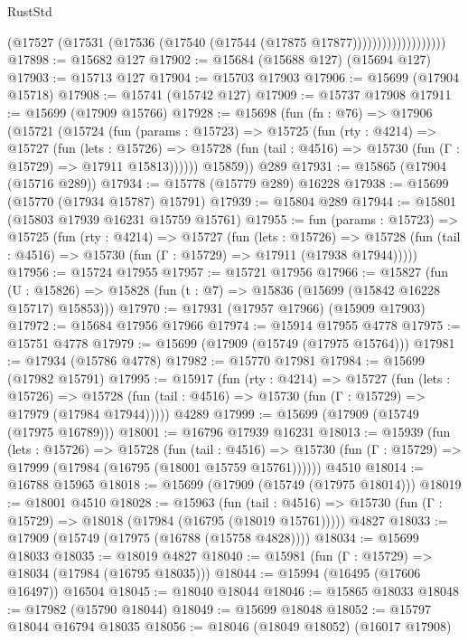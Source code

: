 \begin{lexlean}{RustStd}
\begin{coremodule}
                              (@17527
                                (@17531 (@17536 (@17540 (@17544 (@17875 @17877)))))))))))))))))))
@17898 := @15682 @127
@17902 := @15684 (@15688 @127) (@15694 @127)
@17903 := @15713 @127
@17904 := @15703 @17903
@17906 := @15699 (@17904 @15718)
@17908 := @15741 (@15742 @127)
@17909 := @15737 @17908
@17911 := @15699 (@17909 @15766)
@17928 := @15698
    (fun (fn : @76) =>
    @17906
      (@15721
        (@15724
          (fun (params : @15723) =>
          @15725
            (fun (rty : @4214) =>
            @15727
              (fun (lets : @15726) =>
              @15728 (fun (tail : @4516) => @15730 (fun (Γ : @15729) => @17911 @15813))))))
        @15859))
    @289
@17931 := @15865 (@17904 (@15716 @289))
@17934 := @15778 (@15779 @289) @16228
@17938 := @15699 (@15770 (@17934 @15787) @15791)
@17939 := @15804 @289
@17944 := @15801 (@15803 @17939 @16231 @15759 @15761)
@17955 := fun (params : @15723) =>
  @15725
    (fun (rty : @4214) =>
    @15727
      (fun (lets : @15726) =>
      @15728 (fun (tail : @4516) => @15730 (fun (Γ : @15729) => @17911 (@17938 @17944)))))
@17956 := @15724 @17955
@17957 := @15721 @17956
@17966 := @15827
    (fun (U : @15826) => @15828 (fun (t : @7) => @15836 (@15699 (@15842 @16228 @15717) @15853)))
@17970 := @17931 (@17957 @17966) (@15909 @17903)
@17972 := @15684 @17956 @17966
@17974 := @15914 @17955 @4778
@17975 := @15751 @4778
@17979 := @15699 (@17909 (@15749 (@17975 @15764)))
@17981 := @17934 (@15786 @4778)
@17982 := @15770 @17981
@17984 := @15699 (@17982 @15791)
@17995 := @15917
    (fun (rty : @4214) =>
    @15727
      (fun (lets : @15726) =>
      @15728 (fun (tail : @4516) => @15730 (fun (Γ : @15729) => @17979 (@17984 @17944)))))
    @4289
@17999 := @15699 (@17909 (@15749 (@17975 @16789)))
@18001 := @16796 @17939 @16231
@18013 := @15939
    (fun (lets : @15726) =>
    @15728
      (fun (tail : @4516) =>
      @15730 (fun (Γ : @15729) => @17999 (@17984 (@16795 (@18001 @15759 @15761))))))
    @4510
@18014 := @16788 @15965
@18018 := @15699 (@17909 (@15749 (@17975 @18014)))
@18019 := @18001 @4510
@18028 := @15963
    (fun (tail : @4516) => @15730 (fun (Γ : @15729) => @18018 (@17984 (@16795 (@18019 @15761)))))
    @4827
@18033 := @17909 (@15749 (@17975 (@16788 (@15758 @4828))))
@18034 := @15699 @18033
@18035 := @18019 @4827
@18040 := @15981 (fun (Γ : @15729) => @18034 (@17984 (@16795 @18035)))
@18044 := @15994 (@16495 (@17606 @16497)) @16504
@18045 := @18040 @18044
@18046 := @15865 @18033
@18048 := @17982 (@15790 @18044)
@18049 := @15699 @18048
@18052 := @15797 @18044 @16794 @18035
@18056 := @18046 (@18049 @18052) (@16017 @17908)

\end{coremodule}
\end{lexlean}
